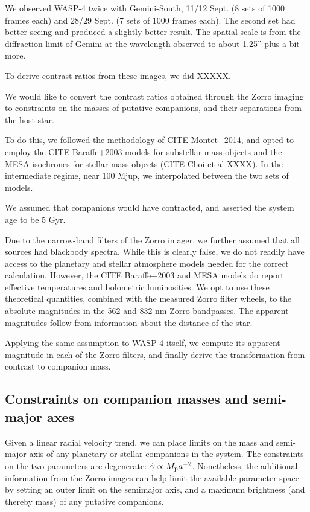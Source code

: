 \documentclass[12pt,twocolumn,tighten]{aastex62}
\begin{document}
We observed WASP-4 twice with Gemini-South, 11/12 Sept. (8 sets of
1000 frames each) and 28/29 Sept. (7 sets of 1000 frames each). The
second set had better seeing and produced a slightly better result.
The spatial scale is from the diffraction limit of Gemini at the
wavelength observed to about 1.25'' plus a bit more.

To derive contrast ratios from these images, we did XXXXX.

We would like to convert the contrast ratios obtained through the
Zorro imaging to constraints on the masses of putative companions, and
their separations from the host star.

To do this, we followed the methodology of CITE Montet+2014, and opted
to employ the CITE Baraffe+2003 models for substellar mass objects and
the MESA isochrones for stellar mass objects (CITE Choi et al XXXX).
In the intermediate regime, near 100 Mjup, we interpolated between the
two sets of models.

We assumed that companions would have contracted, and asserted the
system age to be 5 Gyr.

Due to the narrow-band filters of the Zorro imager, we further assumed
that all sources had blackbody spectra. While this is clearly false,
we do not readily have access to the planetary and stellar atmosphere
models needed for the correct calculation. However, the CITE
Baraffe+2003 and MESA models do report effective temperatures and
bolometric luminosities.  We opt to use these theoretical quantities,
combined with the measured Zorro filter wheels, to the absolute
magnitudes in the 562 and 832 nm Zorro bandpasses.  The apparent
magnitudes follow from information about the distance of the star.

Applying the same assumption to WASP-4 itself, we compute its apparent
magnitude in each of the Zorro filters, and finally derive the
transformation from contrast to companion mass.


\subsection{Constraints on companion masses and semi-major axes}

Given a linear radial velocity trend, we can place limits on the mass
and semi-major axis of any planetary or stellar companions in the
system.
The constraints on the two parameters are degenerate: $\dot{\gamma}
\propto M_{\rm p} a^{-2}$.
Nonetheless, the additional information from the Zorro images can help
limit the available parameter space by setting an outer limit on the
semimajor axis, and a maximum brightness (and thereby mass) of any
putative companions.
\end{document}
